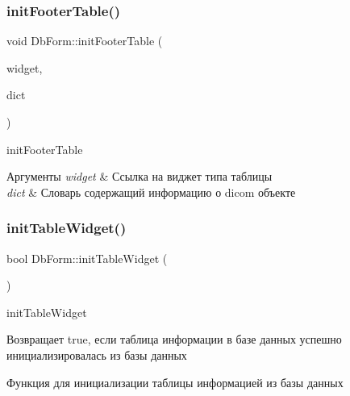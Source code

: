 \subsubsection{\texorpdfstring{init\+Footer\+Table()}{initFooterTable()}}
{\footnotesize\ttfamily void Db\+Form\+::init\+Footer\+Table (\begin{DoxyParamCaption}\item[{Q\+Table\+Widget $\ast$}]{widget,  }\item[{const \hyperlink{tagshelpers_8h_ae25d30658f61420b88a380dc9e40bb74}{dicom\+Dict} \&}]{dict }\end{DoxyParamCaption})\hspace{0.3cm}{\ttfamily [static]}}



init\+Footer\+Table 


\begin{DoxyParams}{Аргументы}
{\em widget} & Ссылка на виджет типа таблицы \\
\hline
{\em dict} & Словарь содержащий информацию о dicom объекте \\
\hline
\end{DoxyParams}
\mbox{\label{classDbForm_af79b6454611a052e4da31db0bac13ed1}} 
\subsubsection{\texorpdfstring{init\+Table\+Widget()}{initTableWidget()}}
{\footnotesize\ttfamily bool Db\+Form\+::init\+Table\+Widget (\begin{DoxyParamCaption}{ }\end{DoxyParamCaption})\hspace{0.3cm}{\ttfamily [private]}}



init\+Table\+Widget 

\begin{DoxyReturn}{Возвращает}
true, если таблица информации в базе данных успешно инициализировалась из базы данных
\end{DoxyReturn}
Функция для инициализации таблицы информацией из базы данных \mbox{\label{classDbForm_ab375348c98051eea969574da00484c29}} 
